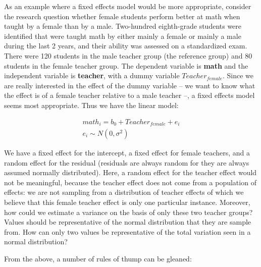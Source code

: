 As an example where a fixed effects model would be more appropriate, consider the research question whether female students perform better at math when taught by a female than by a male. Two-hundred eighth-grade students were identified that were taught math by either mainly a female or mainly a male during the last 2 years, and their ability was assessed on a standardized exam. There were 120 students in the male teacher group (the reference group) and 80 students in the female teacher group. The dependent variable is \textbf{math} and the independent variable is \textbf{teacher}, with a dummy variable \textbf{$Teacher_{female}$}. Since we are really interested in the effect of the dummy variable -- we want to know what the effect is of a female teacher relative to a male teacher --, a fixed effects model seems most appropriate. Thus we have the linear model:

\begin{eqnarray}
math_{i} = b_0 + Teacher_{female} + e_{i} \\
e_{i} \sim N(0, \sigma^2)
\end{eqnarray}

We have a fixed effect for the intercept, a fixed effect for female teachers, and a random effect for the residual (residuals are always random for they are always assumed normally distributed). Here, a random effect for the teacher effect would not be meaningful, because the teacher effect does not come from a population of effects: we are not sampling from a distribution of teacher effects of which we believe that this female teacher effect is only one particular instance. Moreover, how could we estimate a variance on the basis of only these two teacher groups? Values should be representative of the normal distribution that they are sample from. How can only two values be representative of the total variation seen in a normal distribution?

From the above, a number of rules of thump can be gleaned:

